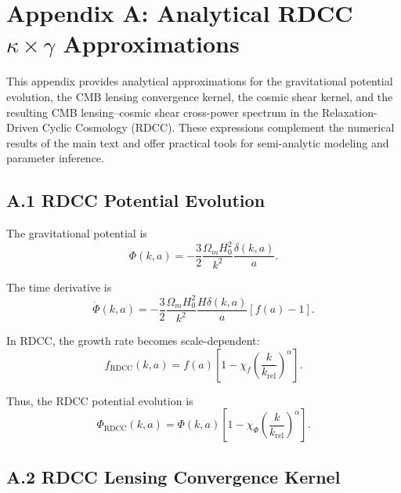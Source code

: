 \documentclass[11pt,a4paper]{article}
\begin{document}
\section*{Appendix A: Analytical RDCC $\kappa \times \gamma$ Approximations}

This appendix provides analytical approximations for the gravitational potential evolution, 
the CMB lensing convergence kernel, the cosmic shear kernel, and the resulting 
CMB lensing--cosmic shear cross-power spectrum in the Relaxation-Driven Cyclic Cosmology 
(RDCC). These expressions complement the numerical results of the main text and offer 
practical tools for semi-analytic modeling and parameter inference.

\subsection*{A.1 RDCC Potential Evolution}

The gravitational potential is
\begin{equation}
    \Phi(k,a)
    = -\frac{3}{2}\frac{\Omega_{m}H_{0}^{2}}{k^{2}}
      \frac{\delta(k,a)}{a}.
\end{equation}

The time derivative is
\begin{equation}
    \dot{\Phi}(k,a)
    = -\frac{3}{2}\frac{\Omega_{m}H_{0}^{2}}{k^{2}}
      \frac{H\delta(k,a)}{a}
      \left[f(a)-1\right].
\end{equation}

In RDCC, the growth rate becomes scale-dependent:
\begin{equation}
    f_{\mathrm{RDCC}}(k,a)
    = f(a)
      \left[
        1 - \chi_{f}
        \left(\frac{k}{k_{\mathrm{rel}}}\right)^{\alpha}
      \right].
\end{equation}

Thus, the RDCC potential evolution is
\begin{equation}
    \Phi_{\mathrm{RDCC}}(k,a)
    = \Phi(k,a)
      \left[
        1 - \chi_{\Phi}
        \left(\frac{k}{k_{\mathrm{rel}}}\right)^{\alpha}
      \right].
\end{equation}

\subsection*{A.2 RDCC Lensing Convergence Kernel}
\end{document}
